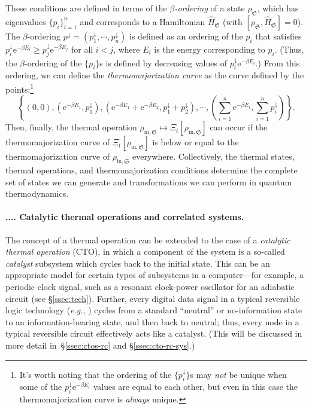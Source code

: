 \documentclass[preprints,article,accept,moreauthors,pdftex]{Definitions/mdpi}
\newcommand{\mypara}[1]{\paragraph{\arabic{section}.\arabic{subsection}.\arabic{subsubsection}.\arabic{paragraph}. #1}}
\begin{document}
\begin{paracol}{2}
These conditions are defined in terms of the \emph{$\beta$-ordering} of a state $\rho_{\mathfrak{S}}$, which has eigenvalues $\{p_{i}\}_{i=1}^{n}$ and corresponds to a Hamiltonian $\widehat{H}_{\mathfrak{S}}$ (with $\left[\rho_{\mathfrak{S}},\widehat{H}_{\mathfrak{S}}\right] = 0$). The $\beta$-ordering $p^{\downarrow} = \left(p^{\downarrow}_{1}, \cdots, p^{\downarrow}_{n}\right)$ is defined \cite{HO13} as an ordering of the $p_{i}$ that satisfies $p^{\downarrow}_{i} \mathrm{e}^{-\beta E_{i}} \geq p^{\downarrow}_{j} \mathrm{e}^{-\beta E_{j}}$ for all $i < j$, where $E_{i}$ is the energy corresponding to $p_{i}$. (Thus, the $\beta$-ordering of the $\{p_{i}\}$s is defined by decreasing values of $p^{\downarrow}_{i} \mathrm{e}^{-\beta E_{i}}$.) From this ordering, we can define the \emph{thermomajorization curve} as the curve defined by the points:\footnote{It's worth noting that the ordering of the $\{p_{i}^{\downarrow}\}$s may \emph{not} be unique when some of the $p^{\downarrow}_{i} \mathrm{e}^{-\beta E_{i}}$ values are equal to each other, but even in this case the thermomajorization curve is \emph{always} unique.}
\begin{equation}
    \label{eq:thermomaj}
    \left\{ \left(0,0\right), \left(\mathrm{e}^{-\beta E_{1}}, p^{\downarrow}_{1} \right), \left(\mathrm{e}^{-\beta E_{1}} + \mathrm{e}^{-\beta E_{2}}, p^{\downarrow}_{1} + p^{\downarrow}_{2} \right), \cdots, \left(\sum_{i=1}^{n} \mathrm{e}^{-\beta E_{i}}, \sum_{i=1}^{n} p^{\downarrow}_{i} \right) \right\}.
\end{equation}
Then, finally, the thermal operation $\rho_{\mathrm{in},\mathfrak{S}} \mapsto \Xi_{t}\left[\rho_{\mathrm{in},\mathfrak{S}}\right]$ can occur if the thermomajorization curve of $\Xi_{t}\left[\rho_{\mathrm{in},\mathfrak{S}}\right]$ is below or equal to the thermomajorization curve of $\rho_{\mathrm{in},\mathfrak{S}}$ everywhere. Collectively, the thermal states, thermal operations, and thermomajorization conditions determine the complete set of states we can generate and transformations we can perform in quantum thermodynamics.

\mypara{Catalytic thermal operations and correlated systems.}
\label{par:ctos}

The concept of a thermal operation can be extended to the case of a \textit{catalytic thermal operation} (CTO), in which a component of the system is a so-called \textit{catalyst} subsystem which cycles back to the initial state. This can be an appropriate model for certain types of subsystems in a computer---for example, a periodic clock signal, such as a resonant clock-power oscillator for an adiabatic circuit (see \S\ref{ssec:tech}). Further, every digital data signal in a typical reversible logic technology (\emph{e.g.}, \cite{Fra+20b}) cycles from a standard ``neutral'' or no-information state to an information-bearing state, and then back to neutral; thus, every node in a typical reversible circuit effectively acts like a catalyst. (This will be discussed in more detail in~\S\ref{ssec:ctos-rc} and \S\ref{ssec:cto-rc-sys}.)


\end{paracol}
\end{document}
